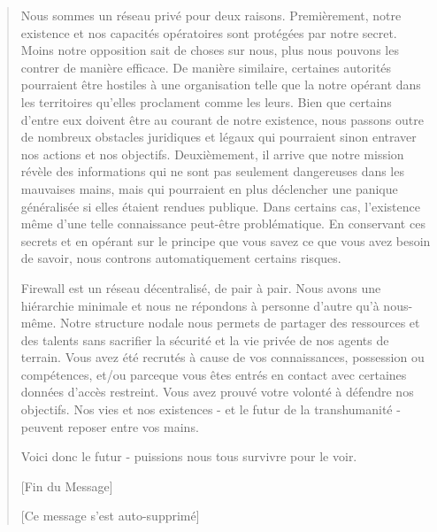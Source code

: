 \begin{quotation}
Nous sommes un réseau privé pour deux raisons. Premièrement, notre existence et
nos capacités opératoires sont protégées par notre secret. Moins notre
opposition sait de choses sur nous, plus nous pouvons les contrer de manière
efficace. De manière similaire, certaines autorités pourraient être hostiles à
une organisation telle que la notre opérant dans les territoires qu'elles
proclament comme les leurs. Bien que certains d'entre eux doivent être au
courant de notre existence, nous passons outre de nombreux obstacles juridiques
et légaux qui pourraient sinon entraver nos actions et nos objectifs.
Deuxièmement, il arrive que notre mission révèle des informations qui ne sont
pas seulement dangereuses dans les mauvaises mains, mais qui pourraient en plus
déclencher une panique généralisée si elles étaient rendues publique. Dans
certains cas, l'existence même d'une telle connaissance peut-être
problématique. En conservant ces secrets et en opérant sur le principe que vous
savez ce que vous avez besoin de savoir, nous controns automatiquement certains
risques. 

Firewall est un réseau décentralisé, de pair à pair. Nous avons une hiérarchie
minimale et nous ne répondons à personne d'autre qu'à nous-même. Notre
structure nodale nous permets de partager des ressources et des talents sans
sacrifier la sécurité et la vie privée de nos agents de terrain. Vous avez été
recrutés à cause de vos connaissances, possession ou compétences, et/ou
parceque vous êtes entrés en contact avec certaines données d'accès restreint.
Vous avez prouvé votre volonté à défendre nos objectifs. Nos vies et nos
existences - et le futur de la transhumanité - peuvent reposer entre vos mains. 

Voici donc le futur - puissions nous tous survivre pour le voir. 

[Fin du Message] 

[Ce message s'est auto-supprimé] 

\end{quotation} 

